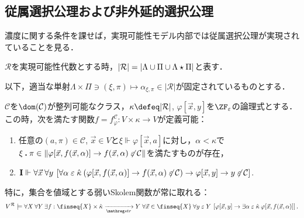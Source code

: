 \documentclass[realisability.tex]{subfiles}
\begin{document}
\subsection{従属選択公理および非外延的選択公理}
濃度に関する条件を課せば，実現可能性モデル内部では従属選択公理が実現されていることを見る．
\begin{definition}
 $\mathcal{R}$を実現可能性代数とする時，$|\mathcal{R}| = \left\lvert\Lambda \cup \Pi \cup \Lambda \mathbin{\star} \Pi\right\rvert$と表す．

 以下，適当な単射$\Lambda \times \Pi \ni (\xi, \pi) \mapsto \alpha_{\xi,\pi} \in |\mathcal{R}|$が固定されているものとする．
\end{definition}

\begin{lemma}\label{lem:weak-skolem-gen}
 $\mathcal{C}$を$\dom(\mathcal{C})$が整列可能なクラス，$\kappa \defeq |\mathcal{R}|$, $\varphi[\vec{x}, y]$を$\ZF_{\varepsilon}$の論理式とする．
 この時，次を満たす関数$f = f^{\mathcal{C}}_{\varphi}: V \times \kappa \to V$が定義可能：
 \begin{enumerate}
  \item \label{item:sk-hered}任意の$(a, \pi) \in \mathcal{C}$, $\vec{x} \in V$と$\xi \Vdash \varphi[\vec{x}, a]$に対し，$\alpha < \kappa$で$\xi \mathbin{\boldsymbol{.}} \pi \in \|\varphi[\vec{x}, f(\vec{x}, \alpha)] \to f(\vec{x}, \alpha) \not\mathrel{\varepsilon} \mathcal{C}\|$を満たすものが存在，
  \item $\mathsf{\mathbf{I}} \Vdash \forall \vec{x} \: \forall y \:\left[ \forall \alpha \mathrel{\varepsilon} \hat{\kappa}\: (\varphi[\vec{x}, f(\vec{x}, \alpha)] \to f(\vec{x},\alpha) \not\mathrel{\varepsilon} \mathcal{C}) \to \varphi[\vec{x}, y] \to y \not\mathrel{\varepsilon} \mathcal{C} \right]$. 
 \end{enumerate}
 特に，集合を値域とする弱いSkolem関数が常に取れる：
 \[
 V^{\mathcal{R}} \models \forall X\: \forall Y \: \exists f: \finseq{X} \times \hat{\kappa} \strto Y\; \forall \vec{x} \in \finseq{X} \:\forall y \strin Y \: 
  \left[\varphi[\vec{x}, y] \to \exists \alpha \strin \hat{\kappa} \: \varphi[\vec{x}, f(\vec{x}, \alpha)]\right].
 \]
\end{lemma}
\end{document}
